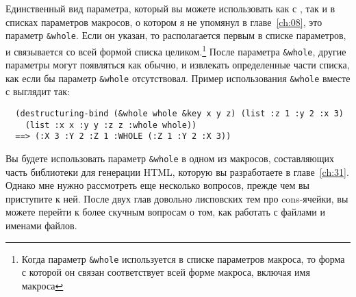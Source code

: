 Единственный вид параметра, который вы можете использовать как с
, так и в списках параметров макросов, о котором я не упомянул в
главе~\ref{ch:08}, это параметр \lstinline!&whole!. Если он указан, то располагается
первым в списке параметров, и связывается со всей формой списка целиком.\footnote{Когда
  параметр \lstinline!&whole! используется в списке параметров макроса, то форма с которой
  он связан соответствует всей форме макроса, включая имя макроса} После параметра
\lstinline!&whole!, другие параметры могут появляться как обычно, и извлекать определенные
части списка, как если бы параметр \lstinline!&whole! отсутствовал. Пример использования
\lstinline!&whole! вместе с  выглядит так:
  
\begin{verbatim}
  (destructuring-bind (&whole whole &key x y z) (list :z 1 :y 2 :x 3)
    (list :x x :y y :z z :whole whole))
  ==> (:X 3 :Y 2 :Z 1 :WHOLE (:Z 1 :Y 2 :X 3))
\end{verbatim}

Вы будете использовать параметр \lstinline!&whole! в одном из макросов, составляющих часть
библиотеки для генерации HTML, которую вы разработаете в главе~\ref{ch:31}.  Однако мне
нужно рассмотреть еще несколько вопросов, прежде чем вы приступите к ней. После двух глав
довольно лисповских тем про cons-ячейки, вы можете перейти к более скучным вопросам о том,
как работать с файлами и именами файлов.






